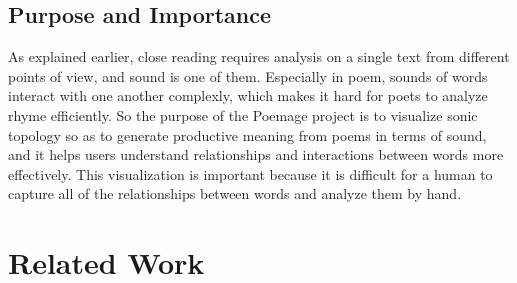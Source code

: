 \documentclass[journal]{vgtc}                %
\begin{document}
\subsection{Purpose and Importance}
As explained earlier, close reading requires analysis on a single text from different points of view, and sound is one of them. Especially in poem, sounds of words interact with one another complexly, which makes it hard for poets to analyze rhyme efficiently. So the purpose of the Poemage project is to visualize sonic topology so as to generate productive meaning from poems in terms of sound, and it helps users understand relationships and interactions between words more effectively. This visualization is important because it is difficult for a human to capture all of the relationships between words and analyze them by hand.


\section{Related Work} \label{research}
\end{document}
